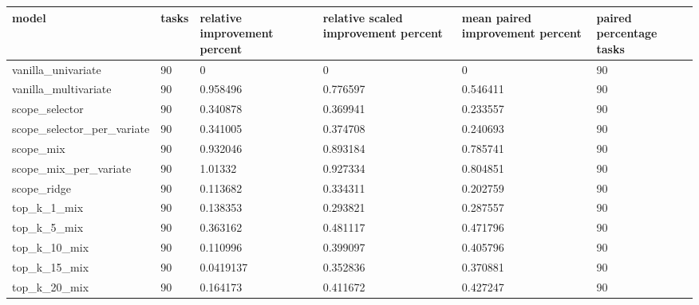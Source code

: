 \begin{tabular}{llllll}
\toprule
model & tasks & relative improvement percent & relative scaled improvement percent & mean paired improvement percent & paired percentage tasks \\
\midrule
vanilla\_univariate & 90 & 0 & 0 & 0 & 90 \\
vanilla\_multivariate & 90 & 0.958496 & 0.776597 & 0.546411 & 90 \\
scope\_selector & 90 & 0.340878 & 0.369941 & 0.233557 & 90 \\
scope\_selector\_per\_variate & 90 & 0.341005 & 0.374708 & 0.240693 & 90 \\
scope\_mix & 90 & 0.932046 & 0.893184 & 0.785741 & 90 \\
scope\_mix\_per\_variate & 90 & 1.01332 & 0.927334 & 0.804851 & 90 \\
scope\_ridge & 90 & 0.113682 & 0.334311 & 0.202759 & 90 \\
top\_k\_1\_mix & 90 & 0.138353 & 0.293821 & 0.287557 & 90 \\
top\_k\_5\_mix & 90 & 0.363162 & 0.481117 & 0.471796 & 90 \\
top\_k\_10\_mix & 90 & 0.110996 & 0.399097 & 0.405796 & 90 \\
top\_k\_15\_mix & 90 & 0.0419137 & 0.352836 & 0.370881 & 90 \\
top\_k\_20\_mix & 90 & 0.164173 & 0.411672 & 0.427247 & 90 \\
\bottomrule
\end{tabular}

